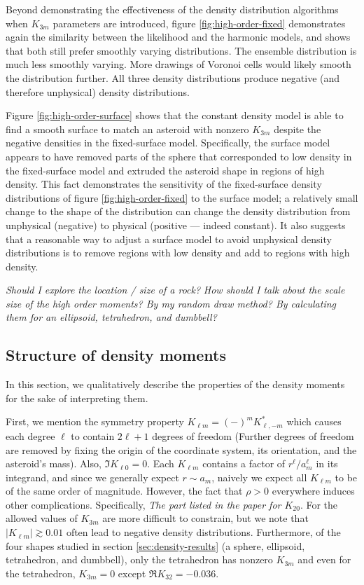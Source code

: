 \documentclass{aastex631}
\newcommand{\jtd}[1]{{\color{red}\textit{#1}}}
\begin{document}
Beyond demonstrating the effectiveness of the density distribution algorithms when $K_{3m}$ parameters are introduced, figure \ref{fig:high-order-fixed} demonstrates again the similarity between the likelihood and the harmonic models, and shows that both still prefer smoothly varying distributions. The ensemble distribution is much less smoothly varying. More drawings of Voronoi cells would likely smooth the distribution further. All three density distributions produce negative (and therefore unphysical) density distributions.

Figure \ref{fig:high-order-surface} shows that the constant density model is able to find a smooth surface to match an asteroid with nonzero $K_{3m}$ despite the negative densities in the fixed-surface model. Specifically, the surface model appears to have removed parts of the sphere that corresponded to low density in the fixed-surface model and extruded the asteroid shape in regions of high density. This fact demonstrates the sensitivity of the fixed-surface density distributions of figure \ref{fig:high-order-fixed} to the surface model; a relatively small change to the shape of the distribution can change the density distribution from unphysical (negative) to physical (positive --- indeed constant). It also suggests that a reasonable way to adjust a surface model to avoid unphysical density distributions is to remove regions with low density and add to regions with high density.

\jtd{Should I explore the location / size of a rock?}
\jtd{How should I talk about the scale size of the high order moments? By my random draw method? By calculating them for an ellipsoid, tetrahedron, and dumbbell?}


\subsection{Structure of density moments}
In this section, we qualitatively describe the properties of the density moments for the sake of interpreting them.

First, we mention the symmetry property $K_{\ell m} = (-)^m K_{\ell,-m}^*$ which causes each degree $\ell$ to contain $2\ell + 1$ degrees of freedom (Further degrees of freedom are removed by fixing the origin of the coordinate system, its orientation, and the asteroid's mass). Also, $\Im K_{\ell 0} = 0$. Each $K_{\ell m}$ contains a factor of $r^\ell / a_m^\ell$ in its integrand, and since we generally expect $r \sim a_m$, naively we expect all $K_{\ell m}$ to be of the same order of magnitude. However, the fact that $\rho > 0$ everywhere induces other complications. Specifically, \jtd{The part listed in the paper for $K_{20}$}. For the allowed values of $K_{3 m}$ are more difficult to constrain, but we note that $|K_{\ell m}| \gtrsim 0.01$ often lead to negative density distributions. Furthermore, of the four shapes studied in section \ref{sec:density-results} (a sphere, ellipsoid, tetrahedron, and dumbbell), only the tetrahedron has nonzero $K_{3 m}$ and even for the tetrahedron, $K_{3m}=0$ except $\Re K_{32} = -0.036$.
\end{document}
